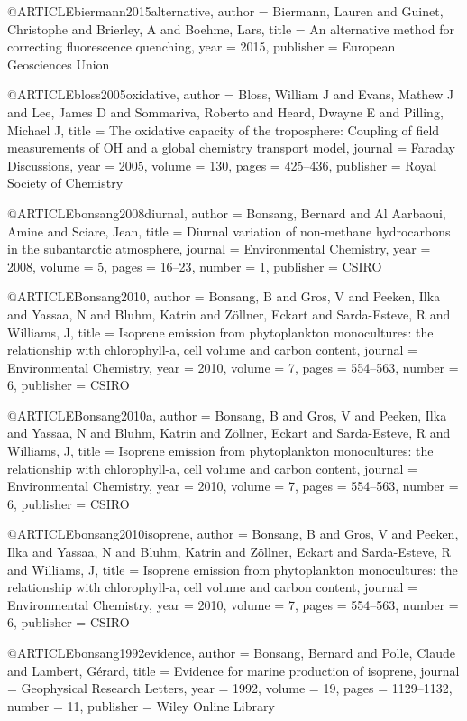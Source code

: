@ARTICLE{biermann2015alternative,
  author = {Biermann, Lauren and Guinet, Christophe and Brierley, A and Boehme,
	Lars},
  title = {An alternative method for correcting fluorescence quenching},
  year = {2015},
  publisher = {European Geosciences Union}
}

@ARTICLE{bloss2005oxidative,
  author = {Bloss, William J and Evans, Mathew J and Lee, James D and Sommariva,
	Roberto and Heard, Dwayne E and Pilling, Michael J},
  title = {The oxidative capacity of the troposphere: Coupling of field measurements
	of OH and a global chemistry transport model},
  journal = {Faraday Discussions},
  year = {2005},
  volume = {130},
  pages = {425--436},
  publisher = {Royal Society of Chemistry}
}

@ARTICLE{bonsang2008diurnal,
  author = {Bonsang, Bernard and Al Aarbaoui, Amine and Sciare, Jean},
  title = {Diurnal variation of non-methane hydrocarbons in the subantarctic
	atmosphere},
  journal = {Environmental Chemistry},
  year = {2008},
  volume = {5},
  pages = {16--23},
  number = {1},
  publisher = {CSIRO}
}

@ARTICLE{Bonsang2010,
  author = {Bonsang, B and Gros, V and Peeken, Ilka and Yassaa, N and Bluhm,
	Katrin and Z{\"o}llner, Eckart and Sarda-Esteve, R and Williams,
	J},
  title = {Isoprene emission from phytoplankton monocultures: the relationship
	with chlorophyll-a, cell volume and carbon content},
  journal = {Environmental Chemistry},
  year = {2010},
  volume = {7},
  pages = {554--563},
  number = {6},
  publisher = {CSIRO}
}

@ARTICLE{Bonsang2010a,
  author = {Bonsang, B and Gros, V and Peeken, Ilka and Yassaa, N and Bluhm,
	Katrin and Z{\"o}llner, Eckart and Sarda-Esteve, R and Williams,
	J},
  title = {Isoprene emission from phytoplankton monocultures: the relationship
	with chlorophyll-a, cell volume and carbon content},
  journal = {Environmental Chemistry},
  year = {2010},
  volume = {7},
  pages = {554--563},
  number = {6},
  publisher = {CSIRO}
}

@ARTICLE{bonsang2010isoprene,
  author = {Bonsang, B and Gros, V and Peeken, Ilka and Yassaa, N and Bluhm,
	Katrin and Z{\"o}llner, Eckart and Sarda-Esteve, R and Williams,
	J},
  title = {Isoprene emission from phytoplankton monocultures: the relationship
	with chlorophyll-a, cell volume and carbon content},
  journal = {Environmental Chemistry},
  year = {2010},
  volume = {7},
  pages = {554--563},
  number = {6},
  publisher = {CSIRO}
}

@ARTICLE{bonsang1992evidence,
  author = {Bonsang, Bernard and Polle, Claude and Lambert, G{\'e}rard},
  title = {Evidence for marine production of isoprene},
  journal = {Geophysical Research Letters},
  year = {1992},
  volume = {19},
  pages = {1129--1132},
  number = {11},
  publisher = {Wiley Online Library}
}

